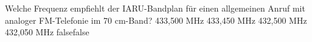     {Welche Frequenz empfiehlt der IARU-Bandplan für einen allgemeinen Anruf mit analoger FM-Telefonie im 70 cm-Band?}
    {433,500 MHz}
    {433,450 MHz}
    {432,500 MHz}
    {432,050 MHz}
    {false}{false}